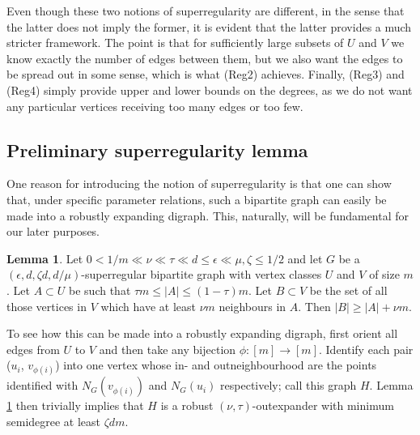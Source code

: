 \documentclass[10pt,letterpaper, reqno]{amsart}
\theoremstyle{definition}
\newtheorem{lemma}[thm]{Lemma}
\numberwithin{equation}{section}
\begin{document}
\noindent Even though these two notions of superregularity are different, in the sense that the latter does not imply the former, it is evident that the latter provides a much stricter framework. The point is that for sufficiently large subsets of $U$ and $V$ we know exactly the number of edges between them, but we also want the edges to be spread out in some sense, which is what (Reg2) achieves. Finally, (Reg3) and (Reg4) simply provide upper and lower bounds on the degrees, as we do not want any particular vertices receiving too many edges or too few.

\subsection{Preliminary superregularity lemma} One reason for introducing the notion of superregularity is that one can show that, under specific parameter relations, such a bipartite graph can easily be made into a robustly expanding digraph. This, naturally, will be fundamental for our later purposes. 

\begin{lemma}\label{4.11}
	Let $0 < 1/m \ll \nu \ll \tau \ll d \leq \epsilon \ll \mu, \zeta \leq 1/2$ and let $G$ be a $(\epsilon, d, \zeta d, d/\mu)$-superregular bipartite graph with vertex classes $U$ and $V$ of size $m$. Let $A \subset U$ be such that $\tau m \leq |A| \leq (1-\tau)m$. Let $B \subset V$ be the set of all those vertices in $V$ which have at least $\nu m $ neighbours in $A$. Then $|B| \geq |A| + \nu m$.
\end{lemma}

\noindent To see how this can be made into a robustly expanding digraph, first orient all edges from $U$ to $V$ and then take any bijection $\phi : [m] \to [m]$. Identify each pair ($u_i$, $v_{\phi(i)}$) into one vertex whose in- and outneighbourhood are the points identified with $N_G(v_{\phi(i)})$ and $N_G(u_i)$ respectively; call this graph $H$. Lemma \ref{4.11} then trivially implies that $H$ is a robust $(\nu,\tau)$-outexpander with minimum semidegree at least $\zeta dm$.
\end{document}
